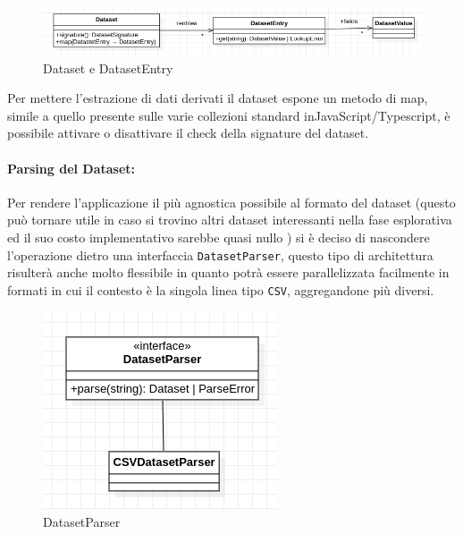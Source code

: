 \begin{figure}[h!]
  \centering
  \includegraphics[scale=0.55]{../../assets/classi_uml/dataset.png}
  \caption{Dataset e DatasetEntry}
\end{figure}

\noindent
Per mettere l'estrazione di dati derivati il dataset espone un metodo di map,
simile a quello presente sulle varie collezioni standard inJavaScript/Typescript,
è possibile attivare o disattivare il check della signature del dataset.

\paragraph{Parsing del Dataset:}
Per rendere l'applicazione il più agnostica possibile al formato del dataset
(questo può tornare utile in caso si trovino altri dataset interessanti nella
fase esplorativa ed il suo costo implementativo sarebbe quasi nullo ) si è deciso di
nascondere l'operazione dietro una interfaccia \texttt{DatasetParser}, questo
tipo di architettura risulterà anche molto flessibile in quanto potrà
essere parallelizzata facilmente in formati in cui il contesto è la singola
linea tipo \texttt{CSV}, aggregandone più diversi.
\begin{figure}[h!]
  \centering
  \includegraphics[scale=0.55]{../../assets/classi_uml/datasetparser.png}
  \caption{DatasetParser}
\end{figure}


